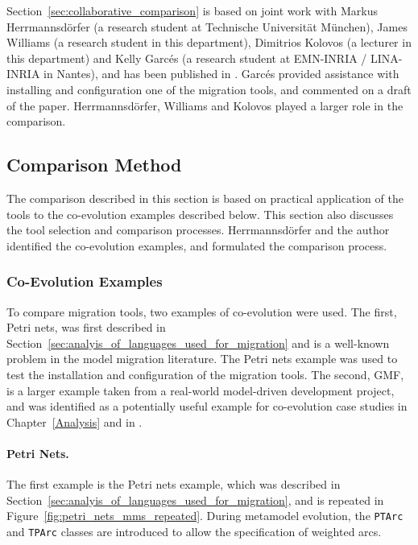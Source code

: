 \begin{framed}
Section~\ref{sec:collaborative_comparison} is based on joint work with Markus Herrmannsd\"{o}rfer (a research student at Technische Universit\"at M\"unchen), James Williams (a research student in this department), Dimitrios Kolovos (a lecturer in this department) and Kelly Garc\'{e}s (a research student at EMN-INRIA / LINA-INRIA in Nantes), and has been published in \cite{rose10comparison}. Garc\'{e}s provided assistance with installing and configuration one of the migration tools, and commented on a draft of the paper. Herrmannsd\"{o}rfer, Williams and Kolovos played a larger role in the comparison.
\end{framed}

\subsection{Comparison Method}
\label{sec:method}

\newcommand{\mm}[1]{\texttt{#1}}
The comparison described in this section is based on practical application of the tools to the co-evolution examples described below. This section also discusses the tool selection and comparison processes. Herrmannsd\"{o}rfer and the author identified the co-evolution examples, and formulated the comparison process.

\subsubsection{Co-Evolution Examples}
\label{subsec:method_examples}
To compare migration tools, two examples of co-evolution were used. The first, Petri nets, was first described in Section~\ref{sec:analyis_of_languages_used_for_migration} and is a well-known problem in the model migration literature. The Petri nets example was used to test the installation and configuration of the migration tools. The second, GMF, is a larger example taken from a real-world model-driven development project, and was identified as a potentially useful example for co-evolution case studies in Chapter~\ref{Analysis} and in \cite{herrmannsdoerfer09gmf}.

\paragraph{Petri Nets.}
The first example is the Petri nets example, which was described in Section~\ref{sec:analyis_of_languages_used_for_migration}, and is repeated in Figure~\ref{fig:petri_nets_mms_repeated}. During metamodel evolution, the \mm{PTArc} and \mm{TPArc} classes are introduced to allow the specification of weighted arcs.

